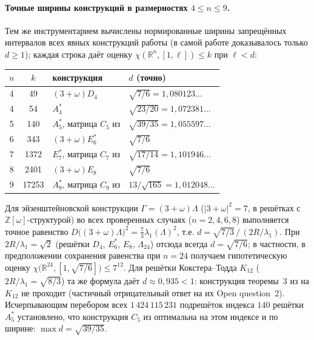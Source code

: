 \documentclass[12pt]{article}
\theoremstyle{definition}
\theoremstyle{remark}
\newcommand{\R}{\mathbb{R}}
\newcommand{\Z}{\mathbb{Z}}
\begin{document}
\paragraph{Точные ширины конструкций \cite{ABPR} в размерностях $4\le n\le9$.}
Тем же инструментарием вычислены нормированные ширины запрещённых интервалов
всех явных конструкций работы \cite{ABPR} (в самой работе доказывалось только
$d\ge1$); каждая строка даёт оценку $\chi(\R^n,[1,\ell])\le k$ при $\ell<d$:
\begin{center}
\begin{tabular}{c c l l}
\hline
$n$ & $k$ & конструкция & $d$ (точно)\\
\hline
4 & 49  & $(3+\omega)D_4$ & $\sqrt{7/6}=1{,}080123\ldots$\\
4 & 54  & $A_4^*$ & $\sqrt{23/20}=1{,}072381\ldots$\\
5 & 140 & $A_5^*$, матрица $C_5$ из \cite{ABPR} & $\sqrt{39/35}=1{,}055597\ldots$\\
6 & 343 & $(3+\omega)E_6^*$ & $\sqrt{7/6}$\\
7 & 1372& $E_7^*$, матрица $C_7$ из \cite{ABPR} & $\sqrt{17/14}=1{,}101946\ldots$\\
8 & 2401& $(3+\omega)E_8$ & $\sqrt{7/6}$\\
9 & 17253& $A_9^*$, матрица $C_9$ из \cite{ABPR} & $13/\sqrt{165}=1{,}012048\ldots$\\
\hline
\end{tabular}
\end{center}

Для эйзенштейновской конструкции $\Gamma=(3+\omega)\Lambda$ ($|3+\omega|^2=7$,
в решётках с $\Z[\omega]$-структурой) во всех проверенных случаях
($n=2,4,6,8$) выполняется точное равенство
$D\bigl((3+\omega)\Lambda\bigr)^2=\tfrac73\lambda_1(\Lambda)^2$, т.е.
$d=\sqrt{7/3}\,/\,(2R/\lambda_1)$. При $2R/\lambda_1=\sqrt2$ (решётки $D_4$,
$E_6^*$, $E_8$, $\Lambda_{24}$) отсюда всегда $d=\sqrt{7/6}$; в частности, в
предположении сохранения равенства при $n=24$ получаем гипотетическую оценку
$\chi\bigl(\R^{24},[1,\sqrt{7/6}]\bigr)\le 7^{12}$. Для решётки Кокстера--Тодда
$K_{12}$ ($2R/\lambda_1=\sqrt{8/3}$) та же формула даёт $d\approx0{,}935<1$:
конструкция теоремы~3 из \cite{ABPR} на $K_{12}$ не проходит (частичный
отрицательный ответ на их Open question~2). Исчерпывающим перебором всех
$1\,424\,115\,231$ подрешёток индекса $140$ решётки $A_5^*$ установлено, что
конструкция $C_5$ из \cite{ABPR} оптимальна на этом индексе и по ширине:
$\max d=\sqrt{39/35}$.
\end{document}
